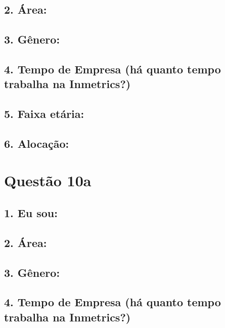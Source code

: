 \documentclass[]{book}
\begin{document}
\hypertarget{area-3}{%
\subsection{2. Área:}\label{area-3}}

\hypertarget{genero-3}{%
\subsection{3. Gênero:}\label{genero-3}}

\hypertarget{tempo-de-empresa-ha-quanto-tempo-trabalha-na-inmetrics-3}{%
\subsection{4. Tempo de Empresa (há quanto tempo trabalha na Inmetrics?)}\label{tempo-de-empresa-ha-quanto-tempo-trabalha-na-inmetrics-3}}

\hypertarget{faixa-etaria-3}{%
\subsection{5. Faixa etária:}\label{faixa-etaria-3}}

\hypertarget{alocacao-3}{%
\subsection{6. Alocação:}\label{alocacao-3}}

\hypertarget{questao-10a}{%
\section{Questão 10a}\label{questao-10a}}

\hypertarget{eu-sou-4}{%
\subsection{1. Eu sou:}\label{eu-sou-4}}

\hypertarget{area-4}{%
\subsection{2. Área:}\label{area-4}}

\hypertarget{genero-4}{%
\subsection{3. Gênero:}\label{genero-4}}

\hypertarget{tempo-de-empresa-ha-quanto-tempo-trabalha-na-inmetrics-4}{%
\subsection{4. Tempo de Empresa (há quanto tempo trabalha na Inmetrics?)}\label{tempo-de-empresa-ha-quanto-tempo-trabalha-na-inmetrics-4}}
\end{document}
